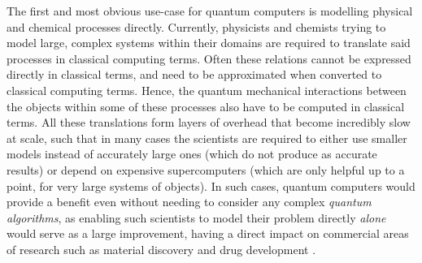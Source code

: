 \documentclass[conference]{IEEEtran}
\begin{document}
The first and most obvious use-case for quantum computers is modelling physical and chemical processes directly.
Currently, physicists and chemists trying to model large,
complex systems within their domains are required to translate said processes in classical
computing terms. Often these relations cannot be expressed directly in classical terms, and need to be approximated when converted to classical computing terms.
Hence, the quantum mechanical interactions between the objects within some of these processes also have to be computed in classical terms.
All these translations form layers of overhead that become incredibly slow at scale,
such that in many cases the scientists are required to either use smaller models
instead of accurately large ones (which do not produce as accurate results) or depend on expensive supercomputers
(which are only helpful up to a point, for very large systems of objects).
In such cases, quantum computers would provide a benefit even without needing to consider any complex \textit{quantum algorithms},
as enabling such scientists to model their problem directly \textit{alone} would serve as a large
improvement, having a direct impact on commercial areas of research such as material discovery and drug development \cite{ref:bova2021commercial}.
\end{document}
